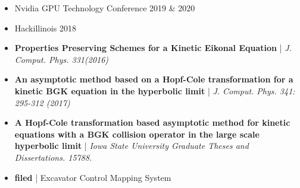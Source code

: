 \documentclass[10pt,a4paper]{altacv}
\begin{document}

\begin{itemize}
\item Nvidia GPU Technology Conference 2019 \& 2020
\item Hackillinois 2018

\end{itemize}


\begin{itemize}
\item \textbf{Properties Preserving Schemes for a Kinetic Eikonal Equation} | \textit{J. Comput. Phys. 331(2016)}
\item \textbf{An asymptotic method based on a Hopf-Cole transformation for a kinetic BGK equation in the hyperbolic limit} | \textit{J. Comput. Phys. 341: 295-312 (2017)}
\item \textbf{A Hopf-Cole transformation based asymptotic method for kinetic equations with a BGK collision operator in the large scale hyperbolic limit} | \textit{Iowa State University Graduate Theses and Dissertations. 15788.}

\end{itemize}


\begin{itemize}
\item \textbf{filed} | Excavator Control Mapping System

\end{itemize}




{}

{}
{}
{}


\clearpage
\end{document}
